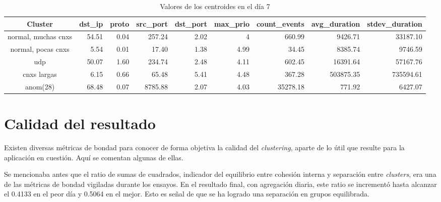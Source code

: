 \begin{table}[h!]
    \begingroup
    \setlength{\tabcolsep}{2pt} %
    \renewcommand{\arraystretch}{2} %
    \hspace*{-3cm}
    \begin{tabular}{|c|r|r|r|r|r|r|r|r|}
    \hline
    \textbf{Cluster}    & \textbf{dst\_ip} & \textbf{proto} & \textbf{src\_port} & \textbf{dst\_port} & \textbf{max\_prio} & \textbf{count\_events} & \textbf{avg\_duration} & \textbf{stdev\_duration} \\ \hline
    normal, muchas cnxs & 54.51            & 0.04           & 257.24             & 2.02               & 4                  & 660.99                 & 9426.71                & 33187.10                 \\ \hline
    normal, pocas cnxs  & 5.54             & 0.01           & 17.40              & 1.38               & 4.99               & 34.45                  & 8385.74                & 9746.59                  \\ \hline
    udp                 & 50.07            & 1.60           & 234.74             & 2.48               & 4.11               & 602.45                 & 16391.64               & 57167.76                 \\ \hline
    cnxs largas         & 6.15             & 0.66           & 65.48              & 5.41               & 4.48               & 367.28                 & 503875.35              & 735594.61                \\ \hline
    anom(28)            & 68.48            & 0.07           & 8785.88            & 2.07               & 4.03               & 35278.18               & 771.92                 & 6427.07                  \\ \hline
    \end{tabular}
    \endgroup
\bigskip
\caption{Valores de los centroides en el día 7}
\bigskip
\label{tab:dia7}
\end{table}

\section{Calidad del resultado}\label{sec:calidadresultado}

Existen diversas métricas de bondad para conocer de forma objetiva la calidad del \emph{clustering}, aparte de lo útil que resulte para la aplicación en cuestión.
Aquí se comentan algunas de ellas.

Se mencionaba antes que el ratio de sumas de cuadrados, indicador del equilibrio entre cohesión interna y separación entre \emph{clusters}, era una de las métricas de bondad vigiladas durante los ensayos.
En el resultado final, con agregación diaria, este ratio se incrementó hasta alcanzar el 0.4133 en el peor día y 0.5064 en el mejor.
Esto es señal de que se ha logrado una separación en grupos equilibrada.

